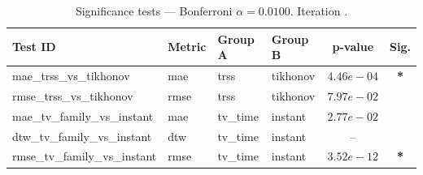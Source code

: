 ﻿%
\begin{table}[ht]
\centering
\caption[EEG reconstruction - Iteration it10]{Significance tests — Bonferroni $\alpha=0.0100$. Iteration .}
\label{tab:sig_it10_synthetic_alpha}
\small
\begin{tabular}{llllcc}
\toprule
Test ID & Metric & Group A & Group B & p-value & Sig. \\
\midrule
mae\_trss\_vs\_tikhonov & mae & trss & tikhonov & $4.46e-04$ & \textbf{*} \\
rmse\_trss\_vs\_tikhonov & rmse & trss & tikhonov & $7.97e-02$ &  \\
mae\_tv\_family\_vs\_instant & mae & tv\_time & instant & $2.77e-02$ &  \\
dtw\_tv\_family\_vs\_instant & dtw & tv\_time & instant & -- &  \\
rmse\_tv\_family\_vs\_instant & rmse & tv\_time & instant & $3.52e-12$ & \textbf{*} \\
\bottomrule
\end{tabular}
\end{table}







